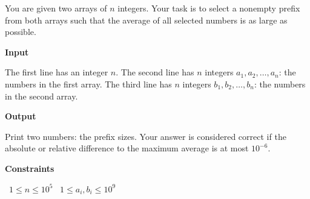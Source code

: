 You are given two arrays of $n$ integers.
Your task is to select a nonempty prefix from both arrays such that the average of all selected numbers is as large as possible.

\vspace{0.3cm}\noindent\textbf{Input}

The first line has an integer $n$.
The second line has $n$ integers $a_1,a_2,\dots,a_n$: the numbers in the first array.
The third line has $n$ integers $b_1,b_2,\dots,b_n$: the numbers in the second array.

\vspace{0.3cm}\noindent\textbf{Output}

Print two numbers: the prefix sizes.
Your answer is considered correct if the absolute or relative difference to the maximum average is at most $10^{-6}$.

\vspace{0.3cm}\noindent\textbf{Constraints}

\textbullet\ $1 \le n \le 10^5$
\textbullet\ $1 \le a_i, b_i \le 10^9$